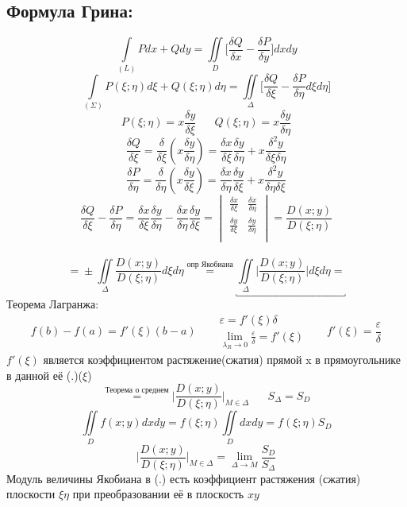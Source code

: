 \documentclass[12pt]{article}
\let\oldint\int
\let\oldiint\iint
\let\oldlim\lim
\renewcommand{\int}{\oldint\limits}
\renewcommand{\iint}{\oldiint\limits}
\renewcommand{\lim}{\oldlim\limits}
\begin{document}
  \subsection*{Формула Грина:}
  \[\int_{(L)} Pdx+Qdy=\iint_D \Big[ \frac{\delta Q}{\delta x} - \frac{\delta P}{\delta y}\Big] dxdy\]
  \[\int_{(\Sigma)}P(\xi;\eta)d\xi+Q(\xi;\eta)d\eta= \iint_{\Delta} \Big[\frac{\delta Q}{\delta \xi} -\frac{\delta P}{\delta \eta} d\xi d\eta \Big]\]
  \[P(\xi;\eta)=x \frac{\delta y}{\delta \xi} \hspace{20pt} Q(\xi;\eta)=x \frac{\delta y}{\delta \eta}\]
  \[\frac{\delta Q}{\delta \xi}=\frac{\delta}{\delta \xi}(x \frac{\delta y}{\delta \eta})=
  \frac{\delta x}{\delta \xi}\frac{\delta y}{\delta \eta}+x\frac{\delta^2y}{\delta\xi \delta\eta}\]
  \[\frac{\delta P}{\delta \eta}=\frac{\delta}{\delta \eta}(x \frac{\delta y}{\delta \xi})=
  \frac{\delta x}{\delta \eta} \frac{\delta y}{\delta \xi}+x \frac{\delta^2 y}{\delta \eta \delta \xi}\]
  \[\frac{\delta Q}{\delta \xi}-\frac{\delta P}{\delta \eta}=\frac{\delta x}{\delta \xi} \frac{\delta y}{\delta \eta}-
  \frac{\delta x}{\delta \eta}\frac{\delta y}{\delta \xi}=
  \begin{vmatrix}
    \frac{\delta x}{\delta \xi} & \frac{\delta x}{\delta \eta}\\
    \frac{\delta y}{\delta \xi} & \frac{\delta y}{\delta \eta}\\
  \end{vmatrix} = \frac{D(x;y)}{D(\xi;\eta)}\]\\
  \[\boxed{=} \pm \iint_\Delta \frac{D(x;y)}{D(\xi;\eta)}d\xi d\eta \overset{\text{опр Якобиана}}{=} 
  \underbracket{\iint_\Delta \Big|\frac{D(x;y)}{D(\xi;\eta)}\Big|d\xi d\eta \boxed{=}}\]
  Теорема Лагранжа:
  \[f(b)-f(a)=f'(\xi)(b-a) \hspace{20pt} 
  \begin{matrix}
    \varepsilon = f'(\xi)\delta\\
    \lim_{\lambda_R \to 0} \frac{\varepsilon}{\delta}=f'(\xi)
  \end{matrix} \hspace{20pt} f'(\xi)=\frac{\varepsilon}{\delta}\]
  $f'(\xi)$ является коэффициентом растяжение(сжатия) прямой x в прямоугольнике в данной её (.)($\xi$)\\
  \[\overset{\hyperref[th:8.12.1]{\text{Теорема о среднем}}}{\boxed{=}}
  \Big|\frac{D(x;y)}{D(\xi;\eta)} \Big|_{M \in \Delta} \hspace{20pt} S_\Delta=S_D\]
  \[\iint_D f(x;y)dxdy=f(\xi;\eta)\iint_D dxdy = f(\xi;\eta)S_D\]
  \[\Big| \frac{D(x;y)}{D(\xi;\eta)}\Big|_{M \in \Delta} = \lim_{\Delta \to M} \frac{S_D}{S_\Delta}\]
  Модуль величины Якобиана в (.) есть коэффициент растяжения (сжатия) плоскости $\xi \eta$ при преобразовании
  её в плоскость $xy$
\end{document}
